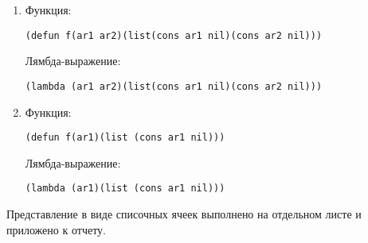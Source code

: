 \begin{enumerate}[wide=0pt]
\begin{enumerate}[label=\arabic*.,wide=0pt]
\begin{lstlisting}
(defun f(ar1 ar2 ar3 ar4)(cons (list ar1 ar2) (list (list ar3 ar4))))
\end{lstlisting}
Лямбда-выражение:
\begin{lstlisting}
(lambda (ar1 ar2 ar3 ar4)(cons (list ar1 ar2) (list (list ar3 ar4))))
\end{lstlisting}
\item  Функция:
\begin{lstlisting}
(defun f(ar1 ar2)(list(cons ar1 nil)(cons ar2 nil)))
\end{lstlisting}
Лямбда-выражение:
\begin{lstlisting}
(lambda (ar1 ar2)(list(cons ar1 nil)(cons ar2 nil)))
\end{lstlisting}
\item  Функция:
\begin{lstlisting}
(defun f(ar1)(list (cons ar1 nil)))
\end{lstlisting}
Лямбда-выражение:
\begin{lstlisting}
(lambda (ar1)(list (cons ar1 nil)))
\end{lstlisting}
\end{enumerate}
Представление в виде списочных ячеек выполнено на отдельном листе и приложено к отчету.
\end{enumerate}